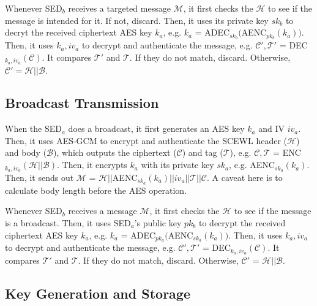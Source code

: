 \documentclass[11pt,oneside,onecolumn,letterpaper]{article}
\begin{document}
Whenever SED$_b$ receives a targeted message $\mathcal{M}$, it first checks the $\mathcal{H}$ to see if the message is intended for it. If not, discard.
Then, it uses its private key $sk_b$ to decryt the received ciphertext AES key $k_a$, e.g. $k_a$ = ADEC$_{sk_b}($AENC$_{pk_b}(k_a))$.
Then, it uses $k_a, iv_a$ to decrypt and authenticate the message, e.g. $\mathcal{C'}, \mathcal{T'}$ = DEC$_{k_a, iv_a}(\mathcal{C})$.
It compares $\mathcal{T'}$ and $\mathcal{T}$.
If they do not match, discard.
Otherwise, $\mathcal{C'}=\mathcal{H}||\mathcal{B}$.


\subsection{Broadcast Transmission}

When the SED$_a$ does a broadcast, it first generates an AES key $k_a$ and IV $iv_a$. 
Then, it uses AES-GCM to encrypt and authenticate the SCEWL header ($\mathcal{H}$) and body ($\mathcal{B}$), which outputs the ciphertext ($\mathcal{C}$) and tag ($\mathcal{T}$), e.g. $\mathcal{C}, \mathcal{T}$ = ENC$_{k_a, iv_a}(\mathcal{H} || \mathcal{B})$.
Then, it encrypts $k_a$ with its private key $sk_a$, e.g. AENC$_{sk_a}(k_a)$.
Then, it sends out $\mathcal{M}$ = $\mathcal{H} || $AENC$_{sk_a}(k_a)||iv_a||\mathcal{T}||\mathcal{C}$.
A caveat here is to calculate body length before the AES operation.

Whenever SED$_b$ receives a message $\mathcal{M}$, it first checks the $\mathcal{H}$ to see if the message is a broadcast.
Then, it uses SED$_a$'s public key $pk_b$ to decrypt the received ciphertext AES key $k_a$, e.g. $k_a$ = ADEC$_{pk_a}($AENC$_{sk_a}(k_a))$.
Then, it uses $k_a, iv_a$ to decrypt and authenticate the message, e.g. $\mathcal{C'}, \mathcal{T'}$ = DEC$_{k_a, iv_a}(\mathcal{C})$.
It compares $\mathcal{T'}$ and $\mathcal{T}$.
If they do not match, discard.
Otherwise, $\mathcal{C'}$ = $\mathcal{H}||\mathcal{B}$.

\subsection{Key Generation and Storage}
\end{document}
